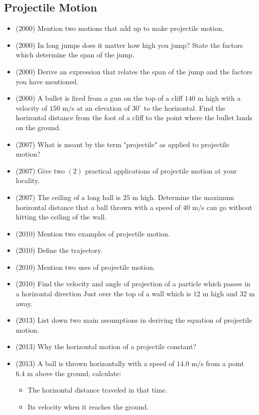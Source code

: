 \documentclass{article}
\begin{document}
\subsection{Projectile Motion}
\begin{itemize}
\item (2000)  Mention two motions that add up to make projectile motion.
\item (2000)  In long jumps does it matter how high you jump? State the factors which determine the span of the jump. 
\item (2000)  Derive an expression that relates the span of the jump and the factors you have mentioned.
\item (2000)  A bullet is fired from a gun on the top of a cliff $ 140$ m high with a velocity of $ 150$ m$/$s at an elevation of $ 30^{\circ}$ to the horizontal. Find the horizontal distance from the foot of a cliff to the point where the bullet lands on the ground.
\item (2007)  What is meant by the term "projectile" as applied to projectile motion?
\item (2007)  Give two $ (2)$ practical applications of projectile motion at your locality.
\item (2007)  The ceiling of a long hall is $ 25$ m high.  Determine the maximum horizontal distance that a ball thrown with a speed of $ 40$ m$/$s can go without hitting the ceiling of the wall.
\item (2010)  Mention two examples of projectile motion. 
\item (2010)  Define the trajectory. 
\item (2010)  Mention two uses of projectile motion.
\item (2010)  Find the velocity and angle of projection of a particle which passes in a horizontal direction Just over the top of a wall which is $ 12$ m high and $ 32$ m away. 
\item (2013)  List down two main assumptions in deriving the equation of projectile motion.
\item (2013)  Why the horizontal motion of a projectile constant? 
\item (2013)  A ball is thrown horizontally with a speed of $ 14.0$ m$/$s from a point $ 6.4$ m above the ground, calculate:\begin{itemize}
\item The horizontal distance traveled in that time.
\item Its velocity when it reaches the ground.
\end{itemize}

\end{itemize}
\end{document}
